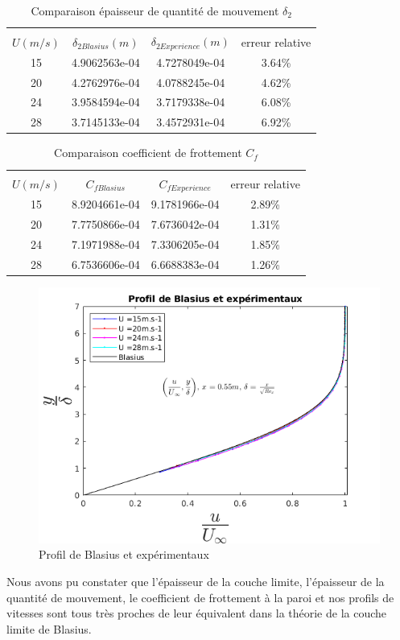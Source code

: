 \begin{table}[ht]
	\centering
	\begin{tabular}{cccc}
		\hline\\
		$U(m/s)$ & $\delta_{2Blasius}(m)$ &
		$ \delta_{2Experience}(m)$ & 
		 erreur relative\\
		\hline
   15 & 4.9062563e-04   & 4.7278049e-04   & 3.64\%\\
   20 & 4.2762976e-04   & 4.0788245e-04   & 4.62\%\\
   24 & 3.9584594e-04   & 3.7179338e-04   & 6.08\%\\
   28 & 3.7145133e-04   & 3.4572931e-04   & 6.92\%
	\end{tabular}
	\caption{Comparaison épaisseur de quantité de mouvement $\delta_{2}$}
\end{table}
\begin{table}[ht]
	\centering
	\begin{tabular}{cccc}
		\hline\\
		$U(m/s)$ & $C_{fBlasius}$ &
		$ C_{fExperience}$ & 
		 erreur relative\\
		\hline
   15 & 8.9204661e-04   & 9.1781966e-04   & 2.89\%\\
   20 & 7.7750866e-04   & 7.6736042e-04   & 1.31\%\\
   24 & 7.1971988e-04   & 7.3306205e-04   & 1.85\%\\
   28 & 6.7536606e-04   & 6.6688383e-04   & 1.26\%
	\end{tabular}
	\caption{Comparaison coefficient de frottement $C_{f}$}
\end{table}
\begin{figure}[ht]
	\centering
	\includegraphics[scale = 0.6]{./image/Bla.png}
	\caption{Profil de Blasius et expérimentaux}
\end{figure}
\newpage
Nous avons pu constater que l'épaisseur de la couche limite, l'épaisseur de la quantité de mouvement, le coefficient de frottement à la paroi et nos profils de vitesses sont tous très proches de leur équivalent dans la théorie de la couche limite de Blasius.
